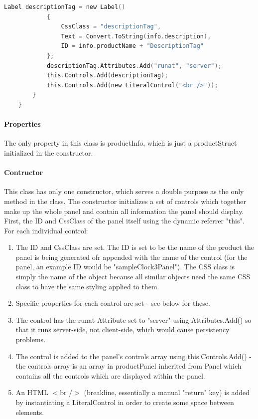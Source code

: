 ﻿\documentclass{article}
\begin{document}
\begin{lstlisting}[language=C]
            Label descriptionTag = new Label()
            {
                CssClass = "descriptionTag",
                Text = Convert.ToString(info.description),
                ID = info.productName + "DescriptionTag"
            };
            descriptionTag.Attributes.Add("runat", "server");
            this.Controls.Add(descriptionTag);
            this.Controls.Add(new LiteralControl("<br />"));
        }
    }
    \end{lstlisting}

    \paragraph{Properties}
    The only property in this class is productInfo, which is just a productStruct initialized in the constructor.
    \paragraph{Contructor}
    This class has only one constructor, which serves a double purpose as the only method in the class.
    The constructor initializes a set of controls which together make up the whole panel and contain all information the panel should display.
    First, the ID and CssClass of the panel itself using the dynamic referrer "this".
    For each individual control:
    \begin{enumerate}
        \item The ID and CssClass are set.
        The ID is set to be the name of the product the panel is being generated ofr appended with the name of the control (for the panel, an example ID would be "sampleClock3Panel").
        The CSS class is simply the name of the object because all similar objects need the same CSS class to have the same styling applied to them.
        \item Specific properties for each control are set - see below for these.
        \item The control has the runat Attribute set to "server" using Attributes.Add() so that it runs server-side, not client-side, which would cause persistency problems.
        \item The control is added to the panel's controls array using this.Controls.Add() - the controls array is an array in productPanel inherited from Panel which contains all the controls which are displayed within the panel.
        \item An HTML $<$br /$>$ (breakline, essentially a manual "return" key) is added by instantiating a LiteralControl in order to create some space between elements.
    \end{enumerate}
\end{document}
